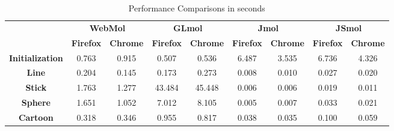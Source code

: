 \documentclass[]{bioinfo}
\begin{document}
\begin{table}[h]
\caption{Performance Comparisons in seconds}
\begin{tabular}{ccccccccc}
\multicolumn{1}{l}{}                                                         & \multicolumn{2}{c}{\textbf{WebMol}}                        & \multicolumn{2}{c}{\textbf{GLmol}}                           & \multicolumn{2}{c}{\textbf{Jmol}}                          & \multicolumn{2}{c}{\textbf{JSmol}}              \\
\multicolumn{1}{l}{}                                                         & \textbf{Firefox}              & \textbf{Chrome}            & \textbf{Firefox}               & \textbf{Chrome}             & \textbf{Firefox}              & \textbf{Chrome}            & \textbf{Firefox}              & \textbf{Chrome} \\
\textbf{Initialization}                                                      & \cellcolor[HTML]{C0C0C0}0.763 & \multicolumn{1}{c|}{0.915} & \cellcolor[HTML]{C0C0C0}0.507  & \multicolumn{1}{c|}{0.536}  & \cellcolor[HTML]{C0C0C0}6.487 & \multicolumn{1}{c|}{3.535} & \cellcolor[HTML]{C0C0C0}6.736 & 4.326           \\
\textbf{Line}                                                                & \cellcolor[HTML]{C0C0C0}0.204 & \multicolumn{1}{c|}{0.145} & \cellcolor[HTML]{C0C0C0}0.173  & \multicolumn{1}{c|}{0.273}  & \cellcolor[HTML]{C0C0C0}0.008 & \multicolumn{1}{c|}{0.010} & \cellcolor[HTML]{C0C0C0}0.027 & 0.020           \\
\textbf{Stick}                                                               & \cellcolor[HTML]{C0C0C0}1.763 & \multicolumn{1}{c|}{1.277} & \cellcolor[HTML]{C0C0C0}43.484 & \multicolumn{1}{c|}{45.448} & \cellcolor[HTML]{C0C0C0}0.006 & \multicolumn{1}{c|}{0.006} & \cellcolor[HTML]{C0C0C0}0.019 & 0.011           \\
\textbf{Sphere}                                                              & \cellcolor[HTML]{C0C0C0}1.651 & \multicolumn{1}{c|}{1.052} & \cellcolor[HTML]{C0C0C0}7.012  & \multicolumn{1}{c|}{8.105}  & \cellcolor[HTML]{C0C0C0}0.005 & \multicolumn{1}{c|}{0.007} & \cellcolor[HTML]{C0C0C0}0.033 & 0.021           \\
\textbf{Cartoon}                                                             & \cellcolor[HTML]{C0C0C0}0.318 & \multicolumn{1}{c|}{0.346} & \cellcolor[HTML]{C0C0C0}0.955  & \multicolumn{1}{c|}{0.817}  & \cellcolor[HTML]{C0C0C0}0.038 & \multicolumn{1}{c|}{0.035} & \cellcolor[HTML]{C0C0C0}0.100 & 0.059           \\

\end{tabular}
\end{table}
\end{document}
